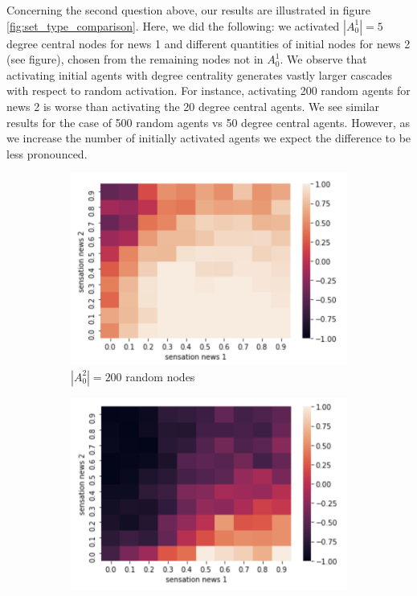 \documentclass[10pt]{article}
\begin{document}
Concerning the second question above, our results are illustrated in figure \ref{fig:set_type_comparison}. Here, we did the following: we activated $|A_0^{1}| = 5$ degree central nodes for news 1 and different quantities of initial nodes for news 2 (see figure), chosen from the remaining nodes not in $A_0^1$. We observe that activating initial agents with degree centrality generates vastly larger cascades with respect to random activation. For instance, activating 200 random agents for news 2 is worse than activating the 20 degree central agents. We see similar results for the case of 500 random agents vs 50 degree central agents. However, as we increase the number of initially activated agents we expect the difference to be less pronounced. \\
\begin{figure}
\centering
\begin{subfigure}{0.475\textwidth}
  \centering
  \includegraphics[width=.9\linewidth]{images/asize200.png}
  \caption{$|A_0^2|=200$ random nodes}
  \label{fig:set_type_comparison:sub1}
\end{subfigure}
\hfill
\begin{subfigure}{0.475\textwidth}
  \centering
  \includegraphics[width=.9\linewidth]{images/asize500.png}

\end{subfigure}
\end{figure}
\end{document}
